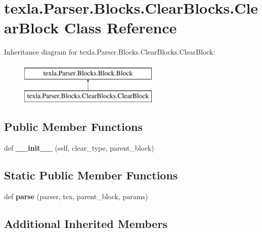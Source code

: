 \hypertarget{classtexla_1_1Parser_1_1Blocks_1_1ClearBlocks_1_1ClearBlock}{}\section{texla.\+Parser.\+Blocks.\+Clear\+Blocks.\+Clear\+Block Class Reference}
\label{classtexla_1_1Parser_1_1Blocks_1_1ClearBlocks_1_1ClearBlock}
Inheritance diagram for texla.\+Parser.\+Blocks.\+Clear\+Blocks.\+Clear\+Block\+:\begin{figure}[H]
\begin{center}
\leavevmode
\includegraphics[height=2.000000cm]{classtexla_1_1Parser_1_1Blocks_1_1ClearBlocks_1_1ClearBlock}
\end{center}
\end{figure}
\subsection*{Public Member Functions}
\begin{DoxyCompactItemize}
\item 
\hypertarget{classtexla_1_1Parser_1_1Blocks_1_1ClearBlocks_1_1ClearBlock_aafb0db30c7bc1cf1990289269edd8935}{}\label{classtexla_1_1Parser_1_1Blocks_1_1ClearBlocks_1_1ClearBlock_aafb0db30c7bc1cf1990289269edd8935} 
def {\bfseries \+\_\+\+\_\+init\+\_\+\+\_\+} (self, clear\+\_\+type, parent\+\_\+block)
\end{DoxyCompactItemize}
\subsection*{Static Public Member Functions}
\begin{DoxyCompactItemize}
\item 
\hypertarget{classtexla_1_1Parser_1_1Blocks_1_1ClearBlocks_1_1ClearBlock_a86bc4796a454ddc54a65ae9b128de284}{}\label{classtexla_1_1Parser_1_1Blocks_1_1ClearBlocks_1_1ClearBlock_a86bc4796a454ddc54a65ae9b128de284} 
def {\bfseries parse} (parser, tex, parent\+\_\+block, params)
\end{DoxyCompactItemize}
\subsection*{Additional Inherited Members}


